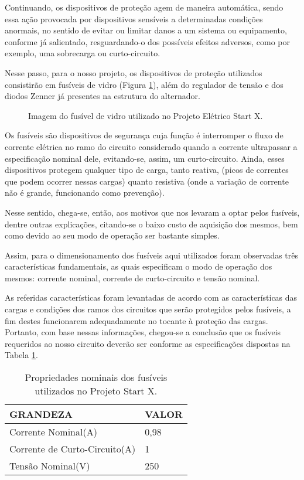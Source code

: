 Continuando, os dispositivos de proteção agem de maneira automática, sendo essa ação provocada por dispositivos sensíveis a determinadas condições anormais, no sentido de evitar ou limitar danos a um sistema ou equipamento, conforme já salientado, resguardando-o dos possíveis efeitos adversos, como por exemplo, uma sobrecarga ou curto-circuito.

Nesse passo, para o nosso projeto, os dispositivos de proteção utilizados consistirão em fusíveis de vidro (Figura \ref{fusivel}), além do regulador de tensão e dos diodos Zenner já presentes na estrutura do alternador.

\begin{figure}[h]
	\centering
	\caption{Imagem do fusível de vidro utilizado no Projeto Elétrico Start X.}
	\label{fusivel}
\end{figure}

Os fusíveis são dispositivos de segurança cuja função é interromper o fluxo de corrente elétrica no ramo do circuito considerado quando a corrente ultrapassar a especificação nominal dele, evitando-se, assim, um curto-circuito. Ainda, esses dispositivos protegem qualquer tipo de carga, tanto reativa, (picos de correntes que podem ocorrer nessas cargas) quanto resistiva (onde a variação de corrente não é grande, funcionando como prevenção).

Nesse sentido, chega-se, então, aos motivos que nos levaram a optar pelos fusíveis, dentre outras explicações, citando-se o baixo custo de aquisição dos mesmos, bem como devido ao seu modo de operação ser bastante simples. 

Assim, para o dimensionamento dos fusíveis aqui utilizados foram observadas três características fundamentais, as quais especificam o modo de operação dos mesmos: corrente nominal, corrente de curto-circuito e tensão nominal. 

As referidas características foram levantadas de acordo com as características das cargas e condições dos ramos dos circuitos que serão protegidos pelos fusíveis, a fim destes funcionarem adequadamente no tocante à proteção das cargas. Portanto, com base nessas informações, chegou-se a conclusão que os fusíveis requeridos ao nosso circuito deverão ser conforme as especificações dispostas na Tabela \ref{propriedade-fusivel}.
 	
\begin{table}[h]
\centering
\begin{tabular}{|l|l|}
\hline
\rowcolor[HTML]{329A9D} 
GRANDEZA  & VALOR                                                   \\ \hline
Corrente Nominal(A) & 0,98 
\\ \hline
Corrente de Curto-Circuito(A) & 1
\\ \hline
Tensão Nominal(V)  & 250
\\ \hline
\end{tabular}
\caption{Propriedades nominais dos fusíveis utilizados no Projeto Start X.}
\label{propriedade-fusivel}
\end{table}

